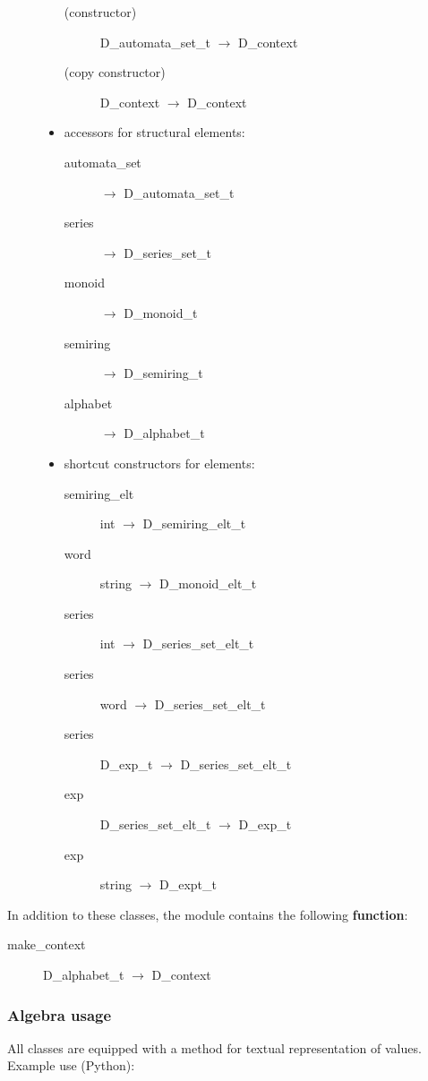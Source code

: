 \begin{description}
\begin{itemize}
\begin{description}
    \item[(constructor)] D\_automata\_set\_t $\to$ D\_context
    \item[(copy constructor)] D\_context $\to$ D\_context
    \end{description}
  \item accessors for structural elements:
    \begin{description}
    \item[automata\_set] $\to$ D\_automata\_set\_t
    \item[series] $\to$ D\_series\_set\_t
    \item[monoid] $\to$ D\_monoid\_t
    \item[semiring] $\to$ D\_semiring\_t
    \item[alphabet] $\to$ D\_alphabet\_t
    \end{description}
  \item shortcut constructors for elements:
    \begin{description}
    \item[semiring\_elt] int $\to$ D\_semiring\_elt\_t
    \item[word] string $\to$ D\_monoid\_elt\_t
    \item[series] int $\to$ D\_series\_set\_elt\_t
    \item[series] word $\to$ D\_series\_set\_elt\_t
    \item[series] D\_exp\_t $\to$ D\_series\_set\_elt\_t
    \item[exp] D\_series\_set\_elt\_t $\to$ D\_exp\_t
    \item[exp] string $\to$ D\_expt\_t
    \end{description}
  \end{itemize}  
\end{description}
       
In  addition  to these  classes,  the module  
contains the following \textbf{function}:

\begin{description}
\item[make\_context] D\_alphabet\_t $\to$ D\_context
\end{description}
  
\subsubsection{Algebra usage}

All classes are equipped with a  method for
textual representation of values. Example use (Python):

